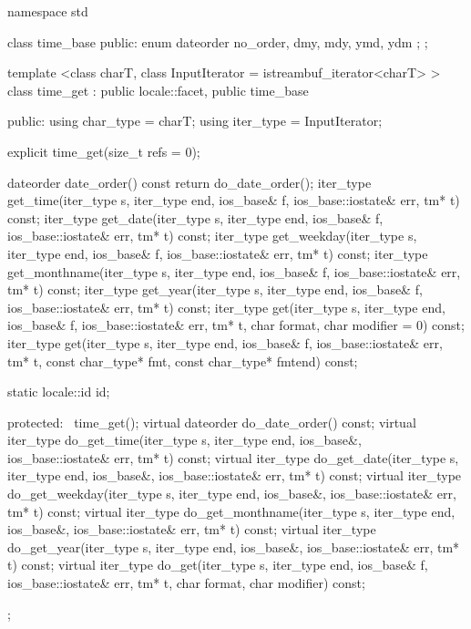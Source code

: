 \begin{codeblock}
namespace std {
  class time_base {
  public:
    enum dateorder { no_order, dmy, mdy, ymd, ydm };
  };

  template <class charT, class InputIterator = istreambuf_iterator<charT> >
  class time_get : public locale::facet, public time_base {
  public:
    using char_type = charT;
    using iter_type = InputIterator;

    explicit time_get(size_t refs = 0);

    dateorder date_order()  const { return do_date_order(); }
    iter_type get_time(iter_type s, iter_type end, ios_base& f,
                       ios_base::iostate& err, tm* t)  const;
    iter_type get_date(iter_type s, iter_type end, ios_base& f,
                       ios_base::iostate& err, tm* t)  const;
    iter_type get_weekday(iter_type s, iter_type end, ios_base& f,
                       ios_base::iostate& err, tm* t) const;
    iter_type get_monthname(iter_type s, iter_type end, ios_base& f,
                       ios_base::iostate& err, tm* t) const;
    iter_type get_year(iter_type s, iter_type end, ios_base& f,
                       ios_base::iostate& err, tm* t) const;
    iter_type get(iter_type s, iter_type end, ios_base& f,
                       ios_base::iostate& err, tm* t, char format, char modifier = 0) const;
    iter_type get(iter_type s, iter_type end, ios_base& f,
                       ios_base::iostate& err, tm* t, const char_type* fmt,
                       const char_type* fmtend) const;

    static locale::id id;

  protected:
    ~time_get();
    virtual dateorder do_date_order()  const;
    virtual iter_type do_get_time(iter_type s, iter_type end, ios_base&,
                                  ios_base::iostate& err, tm* t) const;
    virtual iter_type do_get_date(iter_type s, iter_type end, ios_base&,
                                  ios_base::iostate& err, tm* t) const;
    virtual iter_type do_get_weekday(iter_type s, iter_type end, ios_base&,
                                     ios_base::iostate& err, tm* t) const;
    virtual iter_type do_get_monthname(iter_type s, iter_type end, ios_base&,
                                       ios_base::iostate& err, tm* t) const;
    virtual iter_type do_get_year(iter_type s, iter_type end, ios_base&,
                                  ios_base::iostate& err, tm* t) const;
    virtual iter_type do_get(iter_type s, iter_type end, ios_base& f,
                             ios_base::iostate& err, tm* t, char format, char modifier) const;
  };
}
\end{codeblock}

